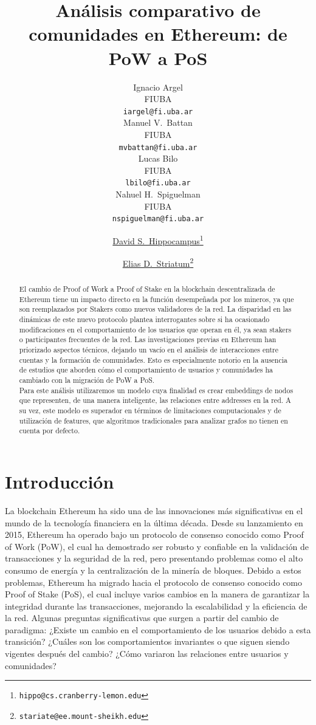 \documentclass{article}
\title{Análisis comparativo de comunidades en Ethereum: de PoW a PoS}
\date{}
\author{{
	\hspace{1mm}Ignacio Argel} \\
	FIUBA\\
	\texttt{iargel@fi.uba.ar} \\
	\And
	{\hspace{1mm}Manuel V.~Battan} \\
	FIUBA\\
	\texttt{mvbattan@fi.uba.ar} \\
	\AND
	{\hspace{1mm}Lucas Bilo} \\
	FIUBA\\
	\texttt{lbilo@fi.uba.ar} \\
	\And
	{\hspace{1mm}Nahuel H.~Spiguelman} \\
	FIUBA\\
	\texttt{nspiguelman@fi.uba.ar} \\
}
\author[1]{%
	\href{https://orcid.org/0000-0000-0000-0000}{\usebox{\orcid}\hspace{1mm}David S.~Hippocampus\thanks{\texttt{hippo@cs.cranberry-lemon.edu}}}%
}
\author[1,2]{%
	\href{https://orcid.org/0000-0000-0000-0000}{\usebox{\orcid}\hspace{1mm}Elias D.~Striatum\thanks{\texttt{stariate@ee.mount-sheikh.edu}}}%
}
\affil[1]{Department of Computer Science, Cranberry-Lemon University, Pittsburgh, PA 15213}
\affil[2]{Department of Electrical Engineering, Mount-Sheikh University, Santa Narimana, Levand}
\begin{document}
\maketitle

\begin{abstract}
	El cambio de Proof of Work a Proof of Stake en la blockchain descentralizada de Ethereum tiene un 
	impacto directo en la función desempeñada por los mineros, ya que son reemplazados por Stakers como nuevos validadores de la red. La disparidad en las dinámicas de este nuevo protocolo plantea interrogantes sobre si ha ocasionado modificaciones en el comportamiento de los usuarios que operan en él, ya sean stakers o participantes frecuentes de la red.\newline
	Las investigaciones previas en Ethereum han priorizado aspectos técnicos, dejando un vacío en el análisis de interacciones entre cuentas y la formación de comunidades. Esto es especialmente notorio en la ausencia de estudios que aborden cómo el comportamiento de usuarios y comunidades ha cambiado con la migración de PoW a PoS.\\
	Para este análisis utilizaremos un modelo cuya finalidad es crear embeddings de nodos que representen, de una manera inteligente, las relaciones entre addresses en la red. A su vez, este modelo es superador en términos de limitaciones computacionales y de utilización de features, que algoritmos tradicionales para analizar grafos no tienen en cuenta por defecto.\\
\end{abstract}




\section{Introducción}
La blockchain Ethereum ha sido una de las innovaciones más significativas en el mundo de la tecnología financiera en la última década. Desde su lanzamiento en 2015, Ethereum ha operado bajo un protocolo de consenso conocido como Proof of Work (PoW), el cual ha demostrado ser robusto y confiable en la validación de transacciones y la seguridad de la red, pero presentando problemas como el alto consumo de energía y la centralización de la minería de bloques. Debido a estos problemas, Ethereum ha migrado hacia el protocolo de consenso conocido como Proof of Stake (PoS), el cual incluye varios cambios en la manera de garantizar la integridad durante las transacciones, mejorando la escalabilidad y la eficiencia de la red.\newline
Algunas preguntas significativas que surgen a partir del cambio de paradigma: ¿Existe un cambio en el comportamiento de los usuarios debido a esta transición? ¿Cuáles son los comportamientos invariantes o que siguen siendo vigentes después del cambio? ¿Cómo variaron las relaciones entre usuarios y comunidades? \newblock
\end{document}
